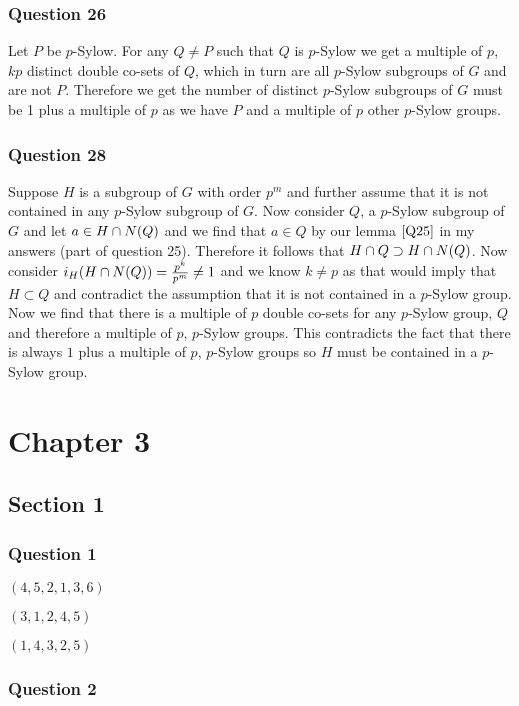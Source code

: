 \documentclass{article}
\begin{document}
\subsubsection{Question 26}
Let $P$ be $p$-Sylow. For any $Q\not=P$ such that $Q$ is $p$-Sylow we get a multiple of $p$, $kp$ distinct double co-sets of $Q$, which in turn are all $p$-Sylow subgroups of $G$ and are not $P$. Therefore we get the number of distinct $p$-Sylow subgroups of $G$ must be 1 plus a multiple of $p$ as we have $P$ and a multiple of $p$ other $p$-Sylow groups.

\subsubsection{Question 28}
Suppose $H$ is a subgroup of $G$ with order $p^m$ and further assume that it is not contained in any $p$-Sylow subgroup of $G$. Now consider $Q$, a $p$-Sylow subgroup of $G$ and let $a \in H\cap N(Q)$ and we find that $a \in Q$ by our lemma $\ref{Q25}$ in my answers (part of question 25). Therefore it follows that $H\cap Q \supset H\cap N(Q)$. Now consider $i_H(H\cap N(Q)) = \frac{p^k}{p^m}\not=1$ and we know $k\not=p$ as that would imply that $H\subset Q$ and contradict the assumption that it is not contained in a $p$-Sylow group. Now we find that there is a multiple of $p$ double co-sets for any $p$-Sylow group, $Q$ and therefore a multiple of $p$, $p$-Sylow groups. This contradicts the fact that there is always $1$ plus a multiple of $p$, $p$-Sylow groups so $H$ must be contained in a $p$-Sylow group.

\section{Chapter 3}
\subsection{Section 1}
\subsubsection{Question 1}
 $(4, 5,2,1,3,6)$

 $(3,1,2,4,5)$

 $(1, 4, 3, 2, 5)$

\subsubsection{Question 2}
\end{document}
